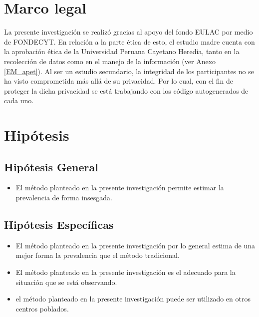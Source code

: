 



\newpage


\section{Marco legal}
La presente investigación se realizó gracias al apoyo del fondo EULAC por medio de FONDECYT. En relación a la parte ética de esto, el estudio madre cuenta con la aprobación ética de la Universidad Peruana Cayetano Heredia,  tanto en la recolección de datos como en el manejo de la información (ver Anexo \ref{EM_apet}). Al ser un estudio secundario, la integridad de los participantes no se ha visto comprometida más allá de su privacidad. Por lo cual, con el fin de proteger la dicha privacidad se está trabajando con los código autogenerados de cada uno.


\section{Hipótesis}

\subsection{Hipótesis General}

\begin{itemize}
	\item El método planteado en la presente investigación permite estimar la prevalencia de forma insesgada.
\end{itemize}


\subsection{Hipótesis Específicas}
\begin{itemize}
    \item El método planteado en la presente investigación por lo general estima de una mejor forma la prevalencia que el método tradicional.
    \item El método planteado en la presente investigación es el adecuado para la situación que se está observando.
    \item el método planteado en la presente investigación puede ser utilizado en otros centros poblados.
\end{itemize}
